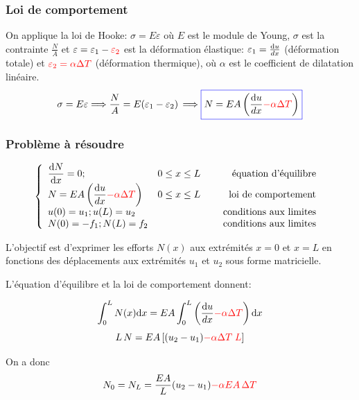 \documentclass[a4paper]{article}
\def \de {{\rm d}}
\newcommand{\myredbox}[1]{\fcolorbox{blue}{white}{$\displaystyle#1$}}
\begin{document}
\subsubsection*{Loi de comportement }
On applique la loi de Hooke: $\sigma = E \varepsilon $ où $E$ est le module de Young, $\sigma$ est la contrainte $\frac{N}{A}$ et $\varepsilon=\varepsilon_1-\color{red}{\varepsilon_2}$ est la déformation élastique: $\varepsilon_1=\frac{\de u}{dx}$ (déformation totale) et $\color{red}{\varepsilon_2=\alpha \Delta T}$ (déformation thermique), où $\alpha$ est le coefficient de dilatation linéaire.
\[ \sigma = E \varepsilon \Longrightarrow\frac{N}{A}=E (\varepsilon_1-\varepsilon_2)\,\Longrightarrow  \myredbox{N=EA\left(\frac{\de u}{dx}{\color{red}{-\alpha \Delta T}}\right)}\]

\subsubsection*{Problème à résoudre}

\[
\left\{
\begin{array}{lcr}
\displaystyle \frac{\de N}{\de x}=0;&0\leq x\leq L &\mbox{ équation d'équilibre } \\
N=EA\displaystyle \left(\frac{\de u}{dx}{\color{red}{-\alpha \Delta T}}\right)& 0\leq x\leq L&\mbox{ loi de comportement } \\
u(0)=u_1 ;u(L)=u_2&&\quad\mbox{ conditions aux limites } \\
N(0)=-f_1 ;N(L)=f_2&&\quad\mbox{ conditions aux limites } 
\end{array}
\right.
\]



L'objectif est d'exprimer les efforts $N(x)$ aux extrémités $x=0$ et $x=L$ en fonctions des déplacements aux extrémités $u_1$ et $u_2$ sous forme matricielle.

L'équation d'équilibre et la loi de comportement donnent:

\[\int_0^LN(x)\mbox{d}x=EA\int_0^L \left(\frac{\de u}{dx}{\color{red}{-\alpha \Delta T}}\right)\mbox{d}x\]
\[L\,N= EA\left[(u_2-u_1){\color{red}{-\alpha \Delta T\; L}}\right]\]

On a donc
\[N_{0}=N_L=\frac{EA}{L}(u_2-u_1){\color{red}{-\alpha EA\,\Delta T }}\]
\end{document}
